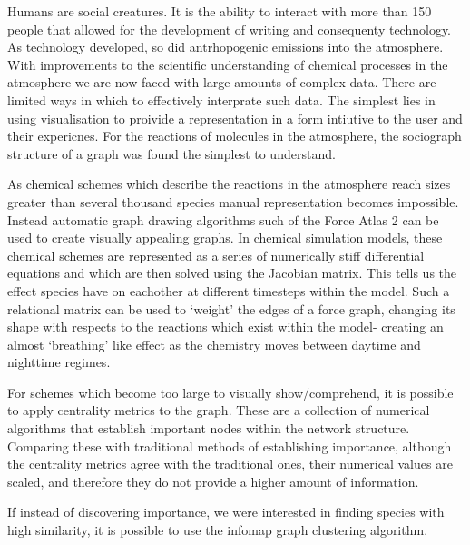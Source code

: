Humans are social creatures. It is the ability to interact with more than 150 people that allowed for the development of writing and consequenty technology. As technology developed, so did antrhopogenic emissions into the atmosphere. With improvements to the scientific understanding of chemical processes in the atmosphere we are now faced with large amounts of complex data. There are limited ways in which to effectively interprate such data. The simplest lies in using visualisation to proivide a representation in a form intiutive to the user and their expericnes. For the reactions of molecules in the atmosphere, the sociograph structure of a graph was found the simplest to understand.

As chemical schemes which describe the reactions in the atmosphere reach sizes greater than several thousand species manual representation becomes impossible. Instead automatic graph drawing algorithms such of the Force Atlas 2 can be used to create visually appealing graphs. In chemical simulation models, these chemical schemes are represented as a series of numerically stiff differential equations and which are then solved using the Jacobian matrix. This tells us the effect species have on eachother at different timesteps within the model. Such a relational matrix can be used to `weight' the edges of a force graph, changing its shape with respects to the reactions which exist within the model- creating an almost `breathing' like effect as the chemistry moves between daytime and nighttime regimes.

For schemes which become too large to visually show/comprehend, it is possible to apply centrality metrics to the graph. These are a collection of numerical algorithms that establish important nodes within the network structure. Comparing these with traditional methods of establishing importance, although the centrality metrics agree with the traditional ones, their numerical values are scaled, and therefore they do not provide a higher amount of information.

If instead of discovering importance, we were interested in finding species with high similarity, it is possible to use the infomap graph clustering algorithm.
